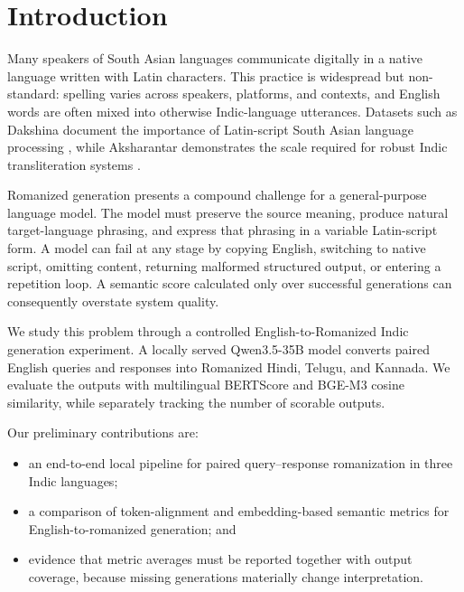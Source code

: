 \section{Introduction}

Many speakers of South Asian languages communicate digitally in a native
language written with Latin characters. This practice is widespread but
non-standard: spelling varies across speakers, platforms, and contexts, and
English words are often mixed into otherwise Indic-language utterances.
Datasets such as Dakshina document the importance of Latin-script South Asian
language processing \cite{roark2020dakshina}, while Aksharantar demonstrates
the scale required for robust Indic transliteration systems
\cite{madhani2023aksharantar}.

Romanized generation presents a compound challenge for a general-purpose
language model. The model must preserve the source meaning, produce natural
target-language phrasing, and express that phrasing in a variable Latin-script
form. A model can fail at any stage by copying English, switching to native
script, omitting content, returning malformed structured output, or entering a
repetition loop. A semantic score calculated only over successful generations
can consequently overstate system quality.

We study this problem through a controlled English-to-Romanized Indic
generation experiment. A locally served Qwen3.5-35B model converts paired
English queries and responses into Romanized Hindi, Telugu, and Kannada. We
evaluate the outputs with multilingual BERTScore and BGE-M3 cosine similarity,
while separately tracking the number of scorable outputs.

Our preliminary contributions are:
\begin{itemize}
    \item an end-to-end local pipeline for paired query--response romanization
    in three Indic languages;
    \item a comparison of token-alignment and embedding-based semantic metrics
    for English-to-romanized generation; and
    \item evidence that metric averages must be reported together with output
    coverage, because missing generations materially change interpretation.
\end{itemize}
